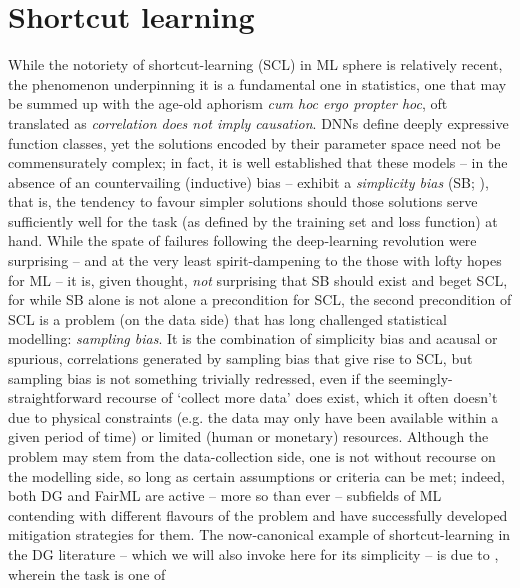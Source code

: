 \section{Shortcut learning}\label{sec:shortcut-learning}

While the notoriety of shortcut-learning (SCL) in ML sphere is relatively recent, the phenomenon
underpinning it is a fundamental one in statistics, one that may be summed up with the age-old
aphorism \emph{cum hoc ergo propter hoc}, oft translated as \emph{correlation does not imply
causation}.
%
DNNs define deeply expressive function classes, yet the solutions encoded by their parameter space
need not be commensurately complex; in fact, it is well established that these models -- in the
absence of an countervailing (inductive) bias -- exhibit a \emph{simplicity bias} (SB;
\cite{valle2018deep}), that is, the tendency to favour simpler solutions should those solutions
serve sufficiently well for the task (as defined by the training set and loss function) at hand.
%
While the spate of failures following the deep-learning revolution were surprising -- and at the
very least spirit-dampening to the those with lofty hopes for ML -- it is, given thought,
\emph{not} surprising that SB should exist and beget SCL, for while SB alone is not alone a
precondition for SCL, the second precondition  of SCL is a problem (on the data side) that has long
challenged statistical modelling: \emph{sampling bias}.
%
It is the combination of simplicity bias and acausal or spurious, correlations generated by
sampling bias that give rise to SCL, but sampling bias is not something trivially redressed, even
if the seemingly-straightforward recourse of `collect more data' does exist, which it often doesn't
due to physical constraints (e.g. the data may only have been available within a given period of
time) or limited (human or monetary) resources.
%
Although the problem may stem from the data-collection side, one is not without recourse on the
modelling side, so long as certain assumptions or criteria can be met;
%
indeed, both DG and FairML are active -- more so than ever -- subfields of ML contending with
different flavours of the problem and have successfully developed mitigation strategies for them.
%
The now-canonical example of shortcut-learning in the DG literature -- which we will also invoke
here for its simplicity -- is due to \cite{beery2018recognition}, wherein the task is one of

